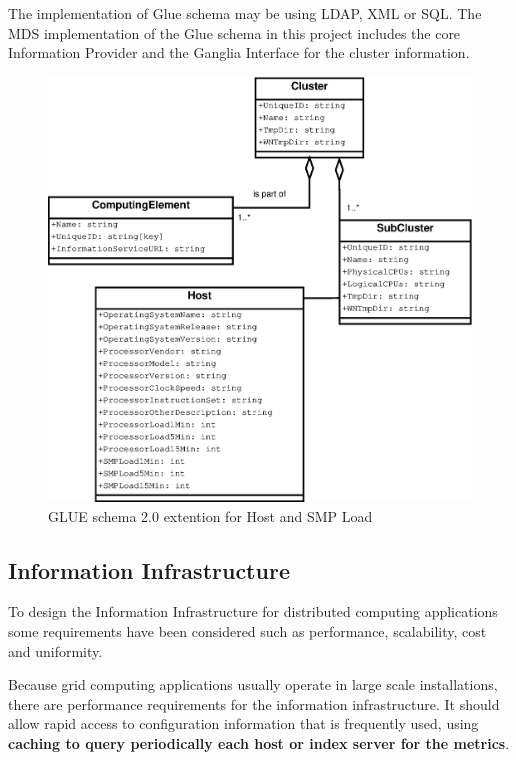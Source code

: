 The implementation of Glue schema may be using LDAP, XML or SQL. The MDS implementation of the Glue schema in this project includes the core Information Provider and the Ganglia Interface for the cluster information.
\newpage

\begin{figure}[htb]
\centering
 \includegraphics[width=5in]{images/gluece_ext.eps}
\caption{GLUE schema 2.0 extention for Host and SMP Load}
\label{figure:gluece_ext}
\end{figure}

\newpage

\subsection{Information Infrastructure}
To design the Information Infrastructure for distributed computing applications some requirements have been considered such as performance, scalability, cost and uniformity.

Because grid computing applications usually operate in large scale installations, there are performance requirements for the information infrastructure. It should allow rapid access to configuration information that is frequently used, using {\bf caching to query periodically each host or index server for the metrics}.

